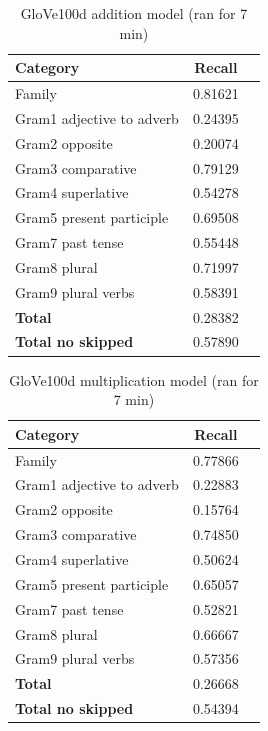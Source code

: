 \begin{center}
    
    \begin{table}[h!]
        \begin{tabular}{| l | c | r}
        	\hline
        	\textbf{Category} &    \textbf{Recall}\\ \hline
        	Family 						& 0.81621 \\
        	Gram1 adjective to adverb 	& 0.24395 \\
        	Gram2 opposite 				& 0.20074 \\
        	Gram3 comparative 			& 0.79129 \\
        	Gram4 superlative 			& 0.54278 \\
        	Gram5 present participle	& 0.69508 \\
        	Gram7 past tense 			& 0.55448 \\
        	Gram8 plural 				& 0.71997 \\
        	Gram9 plural verbs 			& 0.58391 \\
        	\textbf{Total}				& 0.28382 \\
        	\textbf{Total no skipped}	& 0.57890 \\ \hline
        \end{tabular}
    \caption{GloVe100d addition model (ran for 7 min)}
    \label{table:glove100d_addition}
    \end{table}
    
    \begin{table}[h!]
        \begin{tabular}{| l | c | r}
        	\hline
        	\textbf{Category} &    \textbf{Recall}\\ \hline
        	Family 						& 0.77866 \\
        	Gram1 adjective to adverb 	& 0.22883 \\
        	Gram2 opposite 				& 0.15764 \\
        	Gram3 comparative 			& 0.74850 \\
        	Gram4 superlative 			& 0.50624 \\
        	Gram5 present participle	& 0.65057 \\
        	Gram7 past tense 			& 0.52821 \\
        	Gram8 plural 				& 0.66667 \\
        	Gram9 plural verbs 			& 0.57356 \\
        	\textbf{Total}				& 0.26668 \\
        	\textbf{Total no skipped}	& 0.54394 \\ \hline
        \end{tabular}
    \caption{GloVe100d multiplication model (ran for 7 min)}
    \label{table:glove100d_addition}
    \end{table}
    

\end{center}
